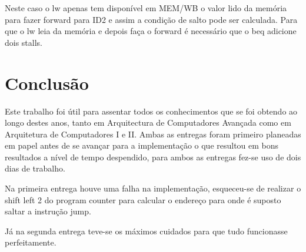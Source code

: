 \documentclass[pdftex,12pt,a4paper]{report}
\begin{document}
Neste caso o lw apenas tem disponível em MEM/WB o valor lido da memória para fazer forward para ID2 e assim a condição de salto pode ser calculada. Para que o lw leia da memória e depois faça o forward é necessário que o beq adicione dois stalls.

\newpage
\section{Conclusão}

Este trabalho foi útil para assentar todos os conhecimentos que se foi obtendo ao longo destes anos, tanto em Arquitectura de Computadores Avançada como em Arquitetura de Computadores I e II. Ambas as entregas foram primeiro planeadas em papel antes de se avançar para a implementação o que resultou em bons resultados a nível de tempo despendido, para ambos as entregas fez-se uso de dois dias de trabalho.

Na primeira entrega houve uma falha na implementação, esqueceu-se de realizar o shift left 2 do program counter para calcular o endereço para onde é suposto saltar a instrução jump.

Já na segunda entrega teve-se os máximos cuidados para que tudo funcionasse perfeitamente.
\end{document}
